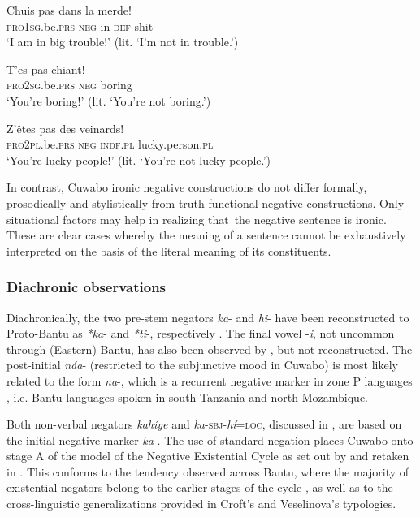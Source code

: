 \documentclass[output=paper,colorlinks=true, citecolor=brown,draftmode]{langscibook}
\begin{document}
\ea\label{ex:cuw:98}
    \ea\label{ex:cuw:98a}
        \gll Chuis pas dans la merde! \\
             \textsc{pro1sg.}be.\textsc{prs} \textsc{neg} in \textsc{def} shit  \\
        \glt  ‘I am in big trouble!’ (lit. ‘I’m not in trouble.’) 

    \ex\label{ex:cuw:98b}
        \gll T’es pas chiant! \\
             \textsc{pro2sg.}be.\textsc{prs} \textsc{neg} boring \\
        \glt  ‘You’re boring!’ (lit. ‘You’re not boring.’)

    \ex\label{ex:cuw:98c}
        \gll Z’êtes pas des veinards!\\
              \textsc{pro2pl.}be.\textsc{prs} \textsc{neg} \textsc{indf}.\textsc{pl} lucky.person.\textsc{pl} \\
        \glt  ‘You’re lucky people!’ (lit. ‘You’re not lucky people.’)
    \z
\z 

In contrast, Cuwabo ironic negative constructions do not differ formally, prosodically and stylistically from truth-functional negative constructions. Only situational factors may help in realizing that~the negative sentence is ironic. These are clear cases whereby the meaning of a sentence cannot be exhaustively interpreted on the basis of the literal meaning of its constituents.

\subsubsection{Diachronic observations}\label{sec:cuw:4.6.5}
Diachronically, the two pre-stem negators \textit{ka}{}- and \textit{hi}{}- have been reconstructed to Proto-Bantu as \textit{*ka}{}- and \textit{*ti}{}-, respectively \citep{Meeussen1967}. The final vowel -\textit{i}, not uncommon through (Eastern) Bantu, has also been observed by \citet{Meeussen1967}, but not reconstructed. The post-initial \textit{náa}{}- (restricted to the subjunctive mood in Cuwabo) is most likely related to the form \textit{na}{}-, which is a recurrent negative marker in zone P languages \citep[115]{KambaMuzenga1981}, i.e. Bantu languages spoken in south Tanzania and north Mozambique. 

Both non-verbal negators \textit{kahíye} and \textit{ka}{}-\textsc{sbj}{}-\textit{hí}=\textsc{loc}, discussed in , are based on the initial negative marker \textit{ka}{}-. The use of standard negation places Cuwabo onto stage A of the model of the Negative Existential Cycle as set out by \citet{Croft1991} and retaken in \citet{Veselinova2013neg.exist,Veselinova2014,Veselinova2016}. This conforms to the tendency observed across Bantu, where the majority of existential negators belong to the earlier stages of the cycle \citep{BernanderEtAl2022}, as well as to the cross-linguistic generalizations provided in Croft’s and Veselinova’s typologies.
\end{document}

